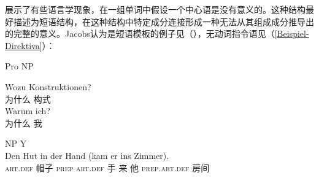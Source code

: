 \begin{exe}
\begin{xlist}[iv.]
\begin{exe}
\begin{xlist}[iv.]
 \citet{Jacobs2008a}展示了有些语言学现象，在一组单词中假设一个中心语是没有意义的。这种结构最好描述为短语结构，在这种结构中特定成分连接形成一种无法从其组成成分推导出的完整的意义。Jacobs认为是短语模板的例子见（），无动词指令语见（\ref{Beispiel-Direktiva}）：
\begin{exe}
\ex Pro NP
\begin{xlist}
\ex
\gll  Wozu Konstruktionen?\\
      为什么 构式\\
\ex 
\gll Warum ich?\\
     为什么 我\\
\end{xlist}
\end{exe}
\ea
NP Y\\
\gll Den Hut in der Hand (kam er ins Zimmer).\\
     \textsc{art}.\textsc{def} 帽子 \textsc{prep} \textsc{art}.\textsc{def} 手 来 他 \textsc{prep}.\textsc{art}.\textsc{def} 房间\\


\end{xlist}
\end{exe}
\end{xlist}
\end{exe}
